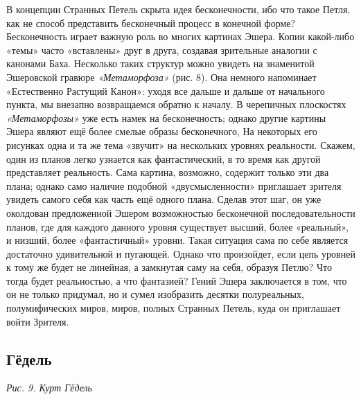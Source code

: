\documentclass[../main.tex]{subfiles}
\begin{document}
В концепции Странных Петель скрыта идея бесконечности, ибо что такое Петля, как не способ представить бесконечный процесс в конечной форме? Бесконечность играет важную роль во многих картинах Эшера. Копии какой-либо «темы» часто «вставлены» друг в друга, создавая зрительные аналогии с канонами Баха. Несколько таких структур можно увидеть на знаменитой Эшеровской гравюре \emph{«Метаморфоза»} (рис. 8). Она немного напоминает «Естественно Растущий Канон»: уходя все дальше и дальше от начального пункта, мы внезапно возвращаемся обратно к началу. В черепичных плоскостях \emph{«Метаморфозы»} уже есть намек на бесконечность; однако другие картины Эшера являют ещё более смелые образы бесконечного, На некоторых его рисунках одна и та же тема «звучит» на нескольких уровнях реальности. Скажем, один из планов легко узнается как фантастический, в то время как другой представляет реальность. Сама картина, возможно, содержит только эти два плана; однако само наличие подобной «двусмысленности» приглашает зрителя увидеть самого себя как часть ещё одного плана. Сделав этот шаг, он уже околдован предложенной Эшером возможностью бесконечной последовательности планов, где для каждого данного уровня существует высший, более «реальный», и низший, более «фантастичный» уровни. Такая ситуация сама по себе является достаточно удивительной и пугающей. Однако что произойдет, если цепь уровней к тому же будет не линейная, а замкнутая саму на себя, образуя Петлю? Что тогда будет реальностью, а что фантазией? Гений Эшера заключается в том, что он не только придумал, но и сумел изобразить десятки полуреальных, полумифических миров, миров, полных Странных Петель, куда он приглашает войти Зрителя.


\subsection{Гёдель}

\emph{Рис. 9. Курт Гёдель}
\end{document}
